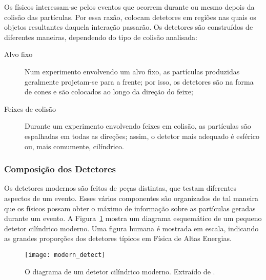 Os físicos interessam-se pelos eventos que ocorrem durante ou mesmo depois da
colisão das partículas. Por essa razão, colocam detetores em regiões nas quais
os objetos resultantes daquela interação passarão. Os detetores são construídos
de diferentes maneiras, dependendo do tipo de colisão analisada:

\begin{description}
\item[Alvo fixo] Num experimento envolvendo um alvo fixo, as partículas
produzidas geralmente projetam-se para a frente; por isso, os detetores são na
forma de cones e são colocados ao longo da direção do feixe;

\item[Feixes de colisão] Durante um experimento envolvendo feixes em
co\-li\-são, as par\-tí\-cu\-las são espalhadas em todas as direções; assim, o
detetor mais adequado é esférico ou, mais comumente, cilíndrico.
\end{description}

\subsubsection{Composição dos Detetores}

Os detetores modernos são feitos de peças distintas, que testam diferentes
aspectos de um evento. Esses vários componentes são organizados de tal maneira
que os físicos possam obter o máximo de informação sobre as partículas geradas
durante um evento. A Figura~\ref{fig:modern-detect} mostra um diagrama
esquemático de um pequeno detetor cilíndrico moderno. Uma figura humana é
mostrada em escala, indicando as grandes proporções dos detetores típicos em
Física de Altas Energias.

\begin{figure}
\begin{center}
\texttt{[image: modern\_detect]}
\end{center}
\caption{O diagrama de um detetor cilíndrico moderno. Extraído de \cite{partadv}.}
\label{fig:modern-detect}
\end{figure}

